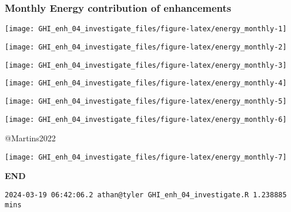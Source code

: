 \documentclass[
  10pt,
  a4paper,oneside]{article}
\begin{document}
\newpage
\FloatBarrier

\hypertarget{monthly-energy-contribution-of-enhancements}{%
\subsubsection{Monthly Energy contribution of enhancements}\label{monthly-energy-contribution-of-enhancements}}

\begin{center}\texttt{[image: GHI\_enh\_04\_investigate\_files/figure-latex/energy\_monthly-1]} \end{center}

\begin{center}\texttt{[image: GHI\_enh\_04\_investigate\_files/figure-latex/energy\_monthly-2]} \end{center}

\begin{center}\texttt{[image: GHI\_enh\_04\_investigate\_files/figure-latex/energy\_monthly-3]} \end{center}

\begin{center}\texttt{[image: GHI\_enh\_04\_investigate\_files/figure-latex/energy\_monthly-4]} \end{center}

\begin{center}\texttt{[image: GHI\_enh\_04\_investigate\_files/figure-latex/energy\_monthly-5]} \end{center}

\begin{center}\texttt{[image: GHI\_enh\_04\_investigate\_files/figure-latex/energy\_monthly-6]} \end{center}

@Martins2022

\begin{center}\texttt{[image: GHI\_enh\_04\_investigate\_files/figure-latex/energy\_monthly-7]} \end{center}

\textbf{END}

\begin{verbatim}
2024-03-19 06:42:06.2 athan@tyler GHI_enh_04_investigate.R 1.238885 mins
\end{verbatim}
\end{document}

